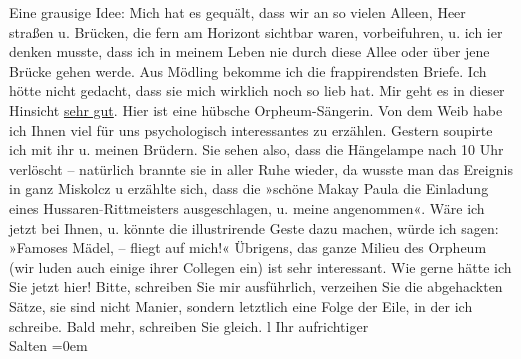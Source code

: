 \begin{ledgroupsized}[t]{13cm}
           \pstart
           Eine grausige Idee: Mich hat es gequält, dass wir an so vielen Alleen, Heer straßen
               u. Brücken,  die fern am Horizont sichtbar waren,
               vorbeifuhren, u. ich i{\geminationm}er denken musste, dass ich in
               meinem Leben nie durch diese Allee oder über jene Brücke gehen werde. \pend
           \pstart
           {\pb}Aus Mödling bekomme ich die frappirendsten Briefe. Ich hötte nicht
               gedacht, dass sie mich
               wirklich noch so lieb hat. Mir geht es in dieser Hinsicht \uline{sehr gut}.\pend
           \pstart
           Hier ist eine hübsche Orpheum-Sängerin. Von dem Weib habe ich
               Ihnen viel für uns psychologisch interessantes zu erzählen.\pend
           \pstart
           Gestern soupirte ich mit ihr u. meinen Brüdern.
               Sie sehen also, dass die Hängelampe nach 10 Uhr verlöscht – natürlich brannte sie in
               aller Ruhe wieder, {\pb}da
               wusste man das Ereignis in ganz Miskolcz u
               erzählte sich, dass die »schöne Makay Paula
               die Einladung eines Hussaren\textcolor{gray}{-}Rittmeisters ausgeschlagen, u. meine
               angenommen«. \pend
           \pstart
           Wäre ich jetzt bei Ihnen, u. könnte die illustrirende Geste dazu machen, würde ich
               sagen: »Famoses Mädel, – fliegt \label{K_L03103-1v}\label{K_L03103-1h} auf mich!«\pend
           \pstart
           Übrigens, das ganze Milieu des Orpheum (wir luden
               auch einige ihrer Collegen ein) ist sehr interessant.\pend
           \pstart
           Wie gerne hätte ich Sie jetzt hier!\pend
           \pstart
           Bitte, schreiben Sie mir ausführlich, verzeihen Sie die abgehackten Sätze, sie sind
               nicht Manier, sondern letztlich eine Folge der Eile, in der ich schreibe.\pend
           \pstart
           Bald mehr, schreiben Sie gleich. l \pend
           \pstart
           Ihr aufrichtiger{\\[\baselineskip]}\spacefill\mbox{Salten}\pend
           \leftskip=0em{}
         

\end{ledgroupsized}
